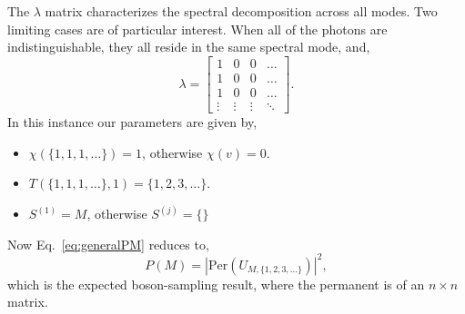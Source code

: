 \documentclass[aps,pra,twocolumn,amsmath,amssymb,nofootinbib,superscriptaddress]{revtex4}
\begin{document}
The $\lambda$ matrix characterizes the spectral decomposition across all modes. Two limiting cases are of particular interest. When all of the photons are indistinguishable, they all reside in the same spectral mode, and,
\begin{equation}
\lambda =
\left[ \begin{array}{cccc}
1 & 0 & 0 & \ldots \\
1 & 0 & 0 & \ldots \\
1 & 0 & 0 & \ldots \\
\vdots & \vdots & \vdots & \ddots
\end{array} \right].
\end{equation}
In this instance our parameters are given by,
\begin{itemize}
\item \mbox{$\chi(\{1,1,1,\dots\})=1$}, otherwise \mbox{$\chi(v)=0$}.
\item \mbox{$T(\{1,1,1,\dots\},1)=\{1,2,3,\dots\}$}.
\item $S^{(1)}=M$, otherwise $S^{(j)}=\{\}$
\end{itemize}
Now Eq.~\ref{eq:generalPM} reduces to,
\begin{equation}
P(M) = \left|\mathrm{Per}\left(U_{M,\{1,2,3,\dots\}}\right)\right|^2,
\end{equation}
which is the expected boson-sampling result, where the permanent is of an \mbox{$n\times n$} matrix.
\end{document}
